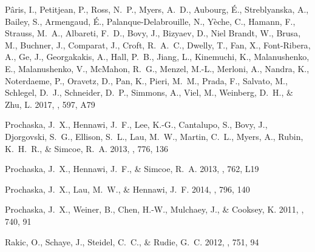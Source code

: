 \documentclass[iop]{emulateapj}
\begin{document}
\begin{thebibliography}{45}
{P{\^a}ris}, I., {Petitjean}, P., {Ross}, N.~P., {Myers}, A.~D., {Aubourg},
  {\'E}., {Streblyanska}, A., {Bailey}, S., {Armengaud}, {\'E}.,
  {Palanque-Delabrouille}, N., {Y{\`e}che}, C., {Hamann}, F., {Strauss}, M.~A.,
  {Albareti}, F.~D., {Bovy}, J., {Bizyaev}, D., {Niel Brandt}, W., {Brusa}, M.,
  {Buchner}, J., {Comparat}, J., {Croft}, R.~A.~C., {Dwelly}, T., {Fan}, X.,
  {Font-Ribera}, A., {Ge}, J., {Georgakakis}, A., {Hall}, P.~B., {Jiang}, L.,
  {Kinemuchi}, K., {Malanushenko}, E., {Malanushenko}, V., {McMahon}, R.~G.,
  {Menzel}, M.-L., {Merloni}, A., {Nandra}, K., {Noterdaeme}, P., {Oravetz},
  D., {Pan}, K., {Pieri}, M.~M., {Prada}, F., {Salvato}, M., {Schlegel}, D.~J.,
  {Schneider}, D.~P., {Simmons}, A., {Viel}, M., {Weinberg}, D.~H., \& {Zhu},
  L. 2017, \aap, 597, A79

{Prochaska}, J.~X., {Hennawi}, J.~F., {Lee}, K.-G., {Cantalupo}, S., {Bovy},
  J., {Djorgovski}, S.~G., {Ellison}, S.~L., {Lau}, M.~W., {Martin}, C.~L.,
  {Myers}, A., {Rubin}, K.~H.~R., \& {Simcoe}, R.~A. 2013{}, \apj,
  776, 136

{Prochaska}, J.~X., {Hennawi}, J.~F., \& {Simcoe}, R.~A. 2013{},
  \apjl, 762, L19

{Prochaska}, J.~X., {Lau}, M.~W., \& {Hennawi}, J.~F. 2014, \apj, 796, 140

{Prochaska}, J.~X., {Weiner}, B., {Chen}, H.-W., {Mulchaey}, J., \& {Cooksey},
  K. 2011, \apj, 740, 91

{Rakic}, O., {Schaye}, J., {Steidel}, C.~C., \& {Rudie}, G.~C. 2012, \apj, 751,
  94


\end{thebibliography}
\end{document}
